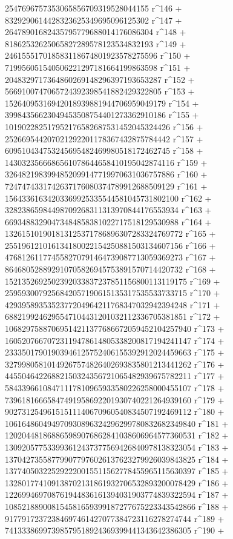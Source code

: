        2547696757353065856709319528044155 r^146 + 
       8329290614428323625349695096125302 r^147 + 
       26478901682435795779688014176086304 r^148 + 
       81862532625065827289578123534832193 r^149 + 
       246155517018583118674801923578275596 r^150 + 
       719956051540506221297181664199863598 r^151 + 
       2048329717364860269148296397193653287 r^152 + 
       5669100747065724392398541882429322805 r^153 + 
       15264095316942018939881944706959049179 r^154 + 
       39984356623049453508754401273362910186 r^155 + 
       101902282517952176582687531452045324426 r^156 + 
       252669544207021292201178367432875784442 r^157 + 
       609510434753245695482469980518172462745 r^158 + 
       1430323566686561078644658410195042874116 r^159 + 
       3264821983994852099147719970631036757886 r^160 + 
       7247474331742637176080374789912688509129 r^161 + 
       15643361634203369925335544581045731802100 r^162 + 
       32823865984498709268311313970844176553934 r^163 + 
       66934883290473484858381022717518129530988 r^164 + 
       132615101901813125371786896307283324769772 r^165 + 
       255196121016134180022154250881503134607156 r^166 + 
       476812611774558270791464739087713059369273 r^167 + 
       864680528892910705826945753891570714420732 r^168 + 
       1521352692502392033837237851156800113119175 r^169 + 
       2595930079256842057190615135317535533733715 r^170 + 
       4293958935352377204964211768347032942394248 r^171 + 
       6882199246295547104431201032112336705381851 r^172 + 
       10682975887069514211377686672059452104257940 r^173 + 
       16052076670723119478614805338200817194241147 r^174 + 
       23335017901903946125752406155392912024459663 r^175 + 
       32799805810149267574826402693835801213441262 r^176 + 
       44550464226882150324356721065482939675782211 r^177 + 
       58433966108471117810965933580226258000455107 r^178 + 
       73961816665847491958692201930740221264939160 r^179 + 
       90273125496151511140670960540834507192469112 r^180 + 
       106164860494970930896324296299780832682349840 r^181 + 
       120204481868865989076862841038606964577360531 r^182 + 
       130920577533993612437377569426840978138323054 r^183 + 
       137042735587799077976026137623279926039843825 r^184 + 
       137740503225292220015511562778455965115630397 r^185 + 
       132801774109138702131861932706532893200078429 r^186 + 
       122699469708761944836161394031903774839322594 r^187 + 
       108521889008154581659399187277675223343542866 r^188 + 
       91779172372384697461427077384723116278274744 r^189 + 
       74133386997398579518924369399441343642386305 r^190 + 
